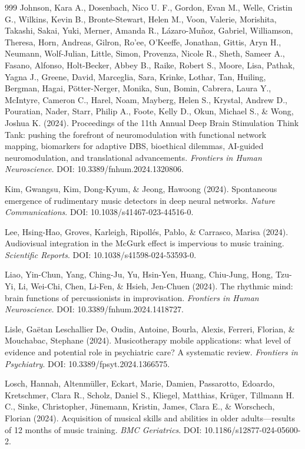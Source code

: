 \documentclass[9pt,onecolumn]{article}
\begin{document}
\begin{thebibliography}{999}
Johnson, Kara A., Dosenbach, Nico U. F., Gordon, Evan M., Welle, Cristin G., Wilkins, Kevin B., Bronte-Stewart, Helen M., Voon, Valerie, Morishita, Takashi, Sakai, Yuki, Merner, Amanda R., Lázaro-Muñoz, Gabriel, Williamson, Theresa, Horn, Andreas, Gilron, Ro'ee, O'Keeffe, Jonathan, Gittis, Aryn H., Neumann, Wolf-Julian, Little, Simon, Provenza, Nicole R., Sheth, Sameer A., Fasano, Alfonso, Holt-Becker, Abbey B., Raike, Robert S., Moore, Lisa, Pathak, Yagna J., Greene, David, Marceglia, Sara, Krinke, Lothar, Tan, Huiling, Bergman, Hagai, Pötter-Nerger, Monika, Sun, Bomin, Cabrera, Laura Y., McIntyre, Cameron C., Harel, Noam, Mayberg, Helen S., Krystal, Andrew D., Pouratian, Nader, Starr, Philip A., Foote, Kelly D., Okun, Michael S., \& Wong, Joshua K. (2024). Proceedings of the 11th Annual Deep Brain Stimulation Think Tank: pushing the forefront of neuromodulation with functional network mapping, biomarkers for adaptive DBS, bioethical dilemmas, AI-guided neuromodulation, and translational advancements. \textit{Frontiers in Human Neuroscience}. DOI: 10.3389/fnhum.2024.1320806.

Kim, Gwangsu, Kim, Dong-Kyum, \& Jeong, Hawoong (2024). Spontaneous emergence of rudimentary music detectors in deep neural networks. \textit{Nature Communications}. DOI: 10.1038/s41467-023-44516-0.

Lee, Hsing-Hao, Groves, Karleigh, Ripollés, Pablo, \& Carrasco, Marisa (2024). Audiovisual integration in the McGurk effect is impervious to music training. \textit{Scientific Reports}. DOI: 10.1038/s41598-024-53593-0.

Liao, Yin-Chun, Yang, Ching-Ju, Yu, Hsin-Yen, Huang, Chiu-Jung, Hong, Tzu-Yi, Li, Wei-Chi, Chen, Li-Fen, \& Hsieh, Jen-Chuen (2024). The rhythmic mind: brain functions of percussionists in improvisation. \textit{Frontiers in Human Neuroscience}. DOI: 10.3389/fnhum.2024.1418727.

Lisle, Gaëtan Leschallier De, Oudin, Antoine, Bourla, Alexis, Ferreri, Florian, \& Mouchabac, Stephane (2024). Musicotherapy mobile applications: what level of evidence and potential role in psychiatric care? A systematic review. \textit{Frontiers in Psychiatry}. DOI: 10.3389/fpsyt.2024.1366575.

Losch, Hannah, Altenmüller, Eckart, Marie, Damien, Passarotto, Edoardo, Kretschmer, Clara R., Scholz, Daniel S., Kliegel, Matthias, Krüger, Tillmann H. C., Sinke, Christopher, Jünemann, Kristin, James, Clara E., \& Worschech, Florian (2024). Acquisition of musical skills and abilities in older adults—results of 12 months of music training. \textit{BMC Geriatrics}. DOI: 10.1186/s12877-024-05600-2.


\end{thebibliography}
\end{document}

